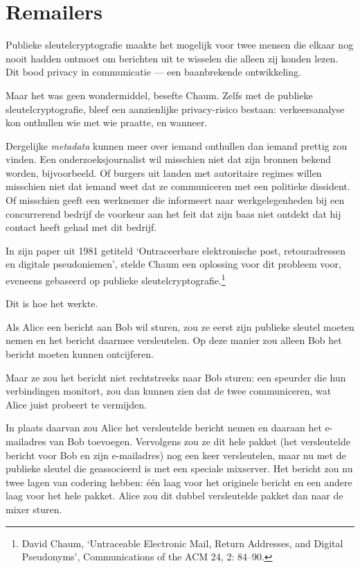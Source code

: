 \documentclass[
  a5paper,
  smalldemyvopaper,11pt,twoside,onecolumn,openright,extrafontsizes]{memoir}
\begin{document}
\section{Remailers}\label{remailers}

Publieke sleutelcryptografie maakte het mogelijk voor twee mensen die
elkaar nog nooit hadden ontmoet om berichten uit te wisselen die alleen
zij konden lezen. Dit bood privacy in communicatie --- een baanbrekende
ontwikkeling.

Maar het was geen wondermiddel, besefte Chaum. Zelfs met de publieke
sleutelcryptografie, bleef een aanzienlijke privacy-risico bestaan:
verkeersanalyse kon onthullen wie met wie praatte, en wanneer.

Dergelijke \emph{metadata} kunnen meer over iemand onthullen dan iemand
prettig zou vinden. Een onderzoeksjournalist wil misschien niet dat zijn
bronnen bekend worden, bijvoorbeeld. Of burgers uit landen met
autoritaire regimes willen misschien niet dat iemand weet dat ze
communiceren met een politieke dissident. Of misschien geeft een
werknemer die informeert naar werkgelegenheden bij een concurrerend
bedrijf de voorkeur aan het feit dat zijn baas niet ontdekt dat hij
contact heeft gehad met dit bedrijf.

In zijn paper uit 1981 getiteld `Ontraceerbare elektronische post,
retouradressen en digitale pseudoniemen', stelde Chaum een oplossing
voor dit probleem voor, eveneens gebaseerd op publieke
sleutelcryptografie.\footnote{David Chaum, `Untraceable Electronic Mail,
  Return Addresses, and Digital Pseudonyms', Communications of the ACM
  24, 2: 84--90.}

Dit is hoe het werkte.

Als Alice een bericht aan Bob wil sturen, zou ze eerst zijn publieke
sleutel moeten nemen en het bericht daarmee versleutelen. Op deze manier
zou alleen Bob het bericht moeten kunnen ontcijferen.

Maar ze zou het bericht niet rechtstreeks naar Bob sturen: een speurder
die hun verbindingen monitort, zou dan kunnen zien dat de twee
communiceren, wat Alice juist probeert te vermijden.

In plaats daarvan zou Alice het versleutelde bericht nemen en daaraan
het e-mailadres van Bob toevoegen. Vervolgens zou ze dit hele pakket
(het versleutelde bericht voor Bob en zijn e-mailadres) nog een keer
versleutelen, maar nu met de publieke sleutel die geassocieerd is met
een speciale mixserver. Het bericht zou nu twee lagen van codering
hebben: één laag voor het originele bericht en een andere laag voor het
hele pakket. Alice zou dit dubbel versleutelde pakket dan naar de mixer
sturen.
\end{document}
